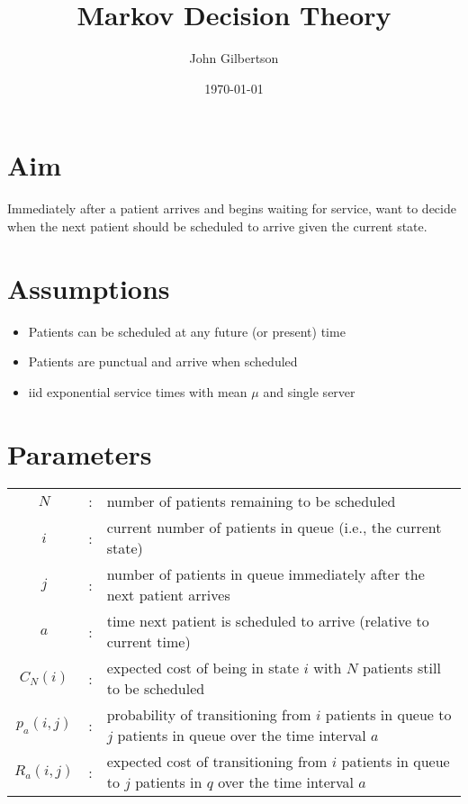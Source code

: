 \documentclass{article}
\title{Markov Decision Theory}
\author{John Gilbertson}
\date{\today}
\begin{document}
\maketitle

\tableofcontents

\newpage

\section{Aim}

Immediately after a patient arrives and begins waiting for service, want to decide when the next patient should be scheduled to arrive given the current state.

\section{Assumptions}

\begin{itemize}
	\item Patients can be scheduled at any future (or present) time
	\item Patients are punctual and arrive when scheduled
	\item iid exponential service times with mean $\mu$ and single server
\end{itemize}

\section{Parameters}

\begin{tabularx}{\textwidth}{c c X}
	$N$ & : & number of patients remaining to be scheduled \\
	$i$ & : & current number of patients in queue (i.e., the current state) \\
	$j$ & : & number of patients in queue immediately after the next patient arrives \\
	$a$ & : & time next patient is scheduled to arrive (relative to current time) \\
	$C_{N} (i)$ & : & expected cost of being in state $i$ with $N$ patients still to be scheduled \\
	$p_{a} (i, j)$ & : & probability of transitioning from $i$ patients in queue to $j$ patients in queue over the time interval $a$ \\
	$R_{a} (i, j)$ & : & expected cost of transitioning from $i$ patients in queue to $j$ patients in $q$ over the time interval $a$ \\
\end{tabularx}
\end{document}
